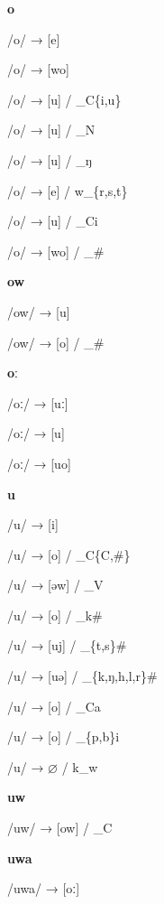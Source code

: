 \begin{center}\textbf{o}\end{center}
\begin{multicols}{4}
\noindent /o/ → [e]

\noindent /o/ → [wo]

\noindent /o/ → [u] / \_C\{i,u\}

\noindent /o/ → [u] / \_N

\noindent /o/ → [u] / \_ŋ

\noindent /o/ → [e] / w\_\{r,s,t\}

\noindent /o/ → [u] / \_Ci

\noindent /o/ → [wo] / \_\#

\end{multicols}

\begin{center}\textbf{ow}\end{center}
\begin{multicols}{4}
\noindent /ow/ → [u]

\noindent /ow/ → [o] / \_\#

\end{multicols}

\begin{center}\textbf{oː}\end{center}
\begin{multicols}{4}
\noindent /oː/ → [uː]

\noindent /oː/ → [u]

\noindent /oː/ → [uo]
\end{multicols}

\begin{center}\textbf{u}\end{center}
\begin{multicols}{4}
\noindent /u/ → [i]

\noindent /u/ → [o] / \_C\{C,\#\}

\noindent /u/ → [əw] / \_V

\noindent /u/ → [o] / \_k\#

\noindent /u/ → [uj] / \_\{t,s\}\#

\noindent /u/ → [uə] / \_\{k,ŋ,h,l,r\}\#

\noindent /u/ → [o] / \_Ca

\noindent /u/ → [o] / \_\{p,b\}i

\noindent /u/ → $\varnothing$ / k\_w

\end{multicols}

\begin{center}\textbf{uw}\end{center}
\begin{multicols}{4}
\noindent /uw/ → [ow] / \_C
\end{multicols}


\begin{center}\textbf{uwa}\end{center}
\begin{multicols}{4}
\noindent /uwa/ → [oː]
\end{multicols}

